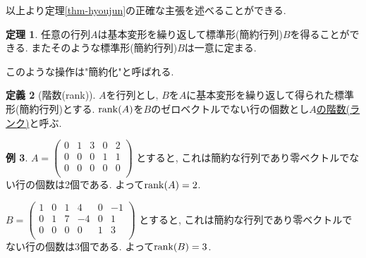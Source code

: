 \documentclass[dvipdfmx,a4paper,11pt]{article}
\theoremstyle{definition}
\newtheorem{thm}{定理}
\newtheorem{dfn}[thm]{定義}
\newtheorem{exa}[thm]{例}
\begin{document}
以上より定理\ref{thm-hyoujun}の正確な主張を述べることができる.
 \begin{tcolorbox}[
    colback = white,
    colframe = green!35!black,
    fonttitle = \bfseries,
    breakable = true]
    \begin{thm}
    \label{thm-kanyakuka}
    任意の行列$A$は基本変形を繰り返して標準形(簡約行列)$B$を得ることができる. またそのような標準形(簡約行列)$B$は一意に定まる.
   \end{thm}
 \end{tcolorbox}
 このような操作は"簡約化"と呼ばれる. 
 
 \begin{tcolorbox}[
    colback = white,
    colframe = green!35!black,
    fonttitle = \bfseries,
    breakable = true]
    \begin{dfn}[階数(rank)]
   \label{dfn-rank}
$A$を行列とし, $B$を$A$に基本変形を繰り返して得られた標準形(簡約行列)とする. 
${\rm rank}(A)$を$B$のゼロベクトルでない行の個数とし\underline{$A$の階数(ランク)}と呼ぶ.
   \end{dfn}
 \end{tcolorbox}
 
 
\begin{exa}
$A=
 \begin{pmatrix}
 0& 1& 3  & 0&2\\
 0& 0& 0  & 1&1\\
 0& 0& 0 & 0&0\\
 \end{pmatrix}
 $
 とすると, これは簡約な行列であり零ベクトルでない行の個数は2個である. よって${\rm rank}(A)=2$.
 
 $B= \begin{pmatrix}
 1& 0& 1  & 4&0&-1\\
 0& 1& 7 & -4&0&1\\
 0& 0& 0 & 0&1&3\\
 \end{pmatrix}
 $ とすると, これは簡約な行列であり零ベクトルでない行の個数は3個である. よって${\rm rank}(B)=3$.
\end{exa}
\end{document}
